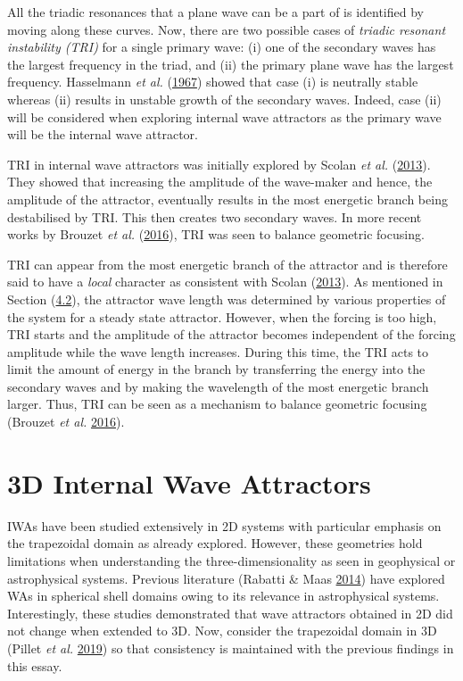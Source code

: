 \documentclass[a4paper]{article}
\numberwithin{equation}{section}
\begin{document}
All the triadic resonances that a plane wave can be a part of is identified by moving along these curves. Now, there are two possible cases of \emph{triadic resonant instability (TRI)} for a single primary wave: (i) one of the secondary waves has the largest frequency in the triad, and (ii) the primary plane wave has the largest frequency. Hasselmann \emph{et al.} (\hyperlink{ref 34}{1967})  showed that case (i) is neutrally stable whereas (ii) results in unstable growth of the secondary waves. Indeed, case (ii) will be considered when exploring internal wave attractors as the primary wave will be the internal wave attractor. 

TRI in internal wave attractors was initially explored by Scolan \emph{et al.} (\hyperlink{ref 35}{2013}). They showed that increasing the amplitude of the wave-maker and hence, the amplitude of the attractor, eventually results in the most energetic branch being destabilised by TRI. This then creates two secondary waves. In more recent works by Brouzet \emph{et al.} (\hyperlink{ref 26}{2016}), TRI was seen to balance geometric focusing. 

TRI can appear from the most energetic branch of the attractor and is therefore said to have a \emph{local} character as consistent with Scolan (\hyperlink{ref 35}{2013}). As mentioned in Section (\hyperref[sec:4.2]{4.2}), the attractor wave length was determined by various properties of the system for a steady state attractor. However, when the forcing is too high, TRI starts and the amplitude of the attractor becomes independent of the forcing amplitude while the wave length increases. During this time, the TRI acts to limit the amount of energy in the branch by transferring the energy into the secondary waves and by making the wavelength of the most energetic branch larger. Thus, TRI can be seen as a mechanism to balance geometric focusing (Brouzet \emph{et al.} \hyperlink{ref 26}{2016}). 

\section{3D Internal Wave Attractors}
\label{sec:7}
IWAs have been studied extensively in 2D systems with particular emphasis on the trapezoidal domain as already explored. However, these geometries hold limitations when understanding the three-dimensionality as seen in geophysical or astrophysical systems. Previous literature (Rabatti \& Maas \hyperlink{ref 36}{2014}) have explored WAs in spherical shell domains owing to its relevance in astrophysical systems. Interestingly, these studies demonstrated that wave attractors obtained in 2D did not change when extended to 3D. Now, consider the trapezoidal domain in 3D (Pillet \emph{et al.} \hyperlink{ref 37}{2019}) so that consistency is maintained with the previous findings in this essay.
\end{document}
